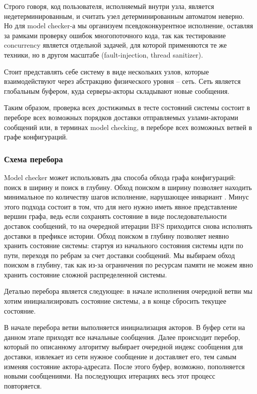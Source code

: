 Строго говоря, код пользователя, исполняемый внутри узла, является недетерминированным, и считать узел детерминированным автоматом неверно. Но для model checker-а мы организуем псевдоконкурентное исполнение, оставляя за рамками проверку ошибок многопоточного кода, так как тестирование concurrency является отдельной задачей, для которой применяются те же техники, но в другом масштабе (fault-injection, thread sanitizer).

Стоит представлять себе систему в виде нескольких узлов, которые взаимодействуют через абстракцию физического уровня – сеть. Сеть является глобальным буфером, куда серверы-акторы складывают новые сообщения.

Таким образом, проверка всех достижимых в тесте состояний системы состоит в переборе всех возможных порядков доставки отправляемых узлами-акторами сообщений или, в терминах model checking, в переборе всех возможных ветвей в графе конфигураций.

\subsubsection{Схема перебора}

Model checker может использовать два способа обхода графа конфигураций: поиск в ширину и поиск в глубину. Обход поиском в ширину позволяет находить минимальное по количеству шагов исполнение, нарушающее инвариант \cite{demi}. Минус этого подхода состоит в том, что для него нужно иметь явное представление вершин графа, ведь если сохранять состояние в виде последовательности доставок сообщений, то на очередной итерации BFS приходится снова исполнять доставки в префиксе истории. Обход поиском в глубину позволяет неявно хранить состояние системы: стартуя из начального состояния системы идти по пути, переходя по ребрам за счет доставки сообщений. Мы выбираем обход поиском в глубину, так как из-за ограничения по ресурсам памяти не можем явно хранить состояние сложной распределенной системы.

Деталью перебора является следующее: в начале исполнения очередной ветви мы хотим инициализировать состояние системы, а в конце сбросить текущее состояние. 

В начале перебора ветви выполняется инициализация акторов. В буфер сети на данном этапе приходят все начальные сообщения. Далее происходит перебор, который по описанному алгоритму выбирает очередной индекс сообщения для доставки, извлекает из сети нужное сообщение и доставляет его, тем самым изменяя состояние актора-адресата. После этого буфер, возможно, пополняется новыми сообщениями. На последующих итерациях весь этот процесс повторяется.

